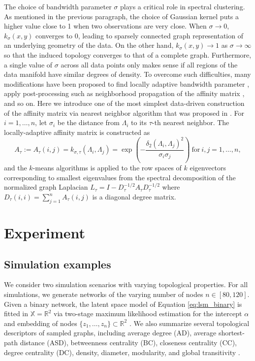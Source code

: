 \documentclass[12pt]{article}
\newcommand{\bbR}{\mathbb{R}}
\newcommand{\bbX}{\mathbb{X}}
\begin{document}
The choice of bandwidth parameter $\sigma$ plays a critical role in spectral clustering. As mentioned in the previous paragraph, the choice of Gaussian kernel puts a higher value close to 1 when two observations are very close. When $\sigma \rightarrow 0$, $k_\sigma (x,y)$ converges to 0, leading to sparsely connected graph representation of an underlying geometry of the data. On the other hand, $k_\sigma(x,y) \rightarrow 1$ as $\sigma \rightarrow \infty$ so that the induced topology converges to that of a complete graph. Furthermore, a single value of $\sigma$ across all data points only makes sense if all regions of the data manifold have similar degrees of density. To overcome such difficulties, many modifications have been proposed to find locally adaptive bandwidth parameter  \citep{zelnik-manor_self-tuning_2004, gu_improved_2009-1, zhang_spectral_2010-1, yang_spectral_2011-1}, apply post-processing such as neighborhood propagation of the affinity matrix \citep{li_constructing_2012-1}, and so on. Here we introduce one of the most simplest data-driven construction of the affinity matrix via nearest neighbor algorithm that was proposed in \cite{zelnik-manor_self-tuning_2004}. For $i=1,\ldots,n$, let $\sigma_i$ be the distance from $\Lambda_i$ to its $\tau$-th nearest neighbor. The locally-adaptive affinity matrix is constructed as
\begin{equation}\label{eq:clustering_zelnik}
A_{\tau}:=A_{\tau} (i,j) = k_{\sigma,\tau} (\Lambda_i, \Lambda_j) = \exp \left( - \frac{\delta_2 (\Lambda_i, \Lambda_j)^2}{\sigma_i \sigma_j}\right)\ \textrm{for} \ i,j=1,\ldots,n,
\end{equation}
and the $k$-means algorithms is applied to the row spaces of $k$ eigenvectors corresponding to smallest eigenvalues from the spectral decomposition of the normalized graph Laplacian $L_{\tau}=I-D_{\tau}^{-1/2}A_{\tau}D_{\tau}^{-1/2}$ where $D_{\tau} (i,i) = \sum_{j=1}^n A_{\tau}(i,j)$ is a diagonal degree matrix. 



\section{Experiment}\label{sec:experiment}
\subsection{Simulation examples}

We consider two simulation scenarios with varying topological properties. For all simulations, we generate networks of the varying number of nodes $n \in [80, 120]$. Given a binary network, the latent space model of Equation \eqref{eq:lsm_binary} is fitted in $\bbX = \bbR^2$ via two-stage maximum likelihood estimation for the intercept $\alpha$ and embedding of nodes $\lbrace z_1, \ldots, z_n \rbrace \subset \bbR^2$ \citep{hoff_latent_2002-1}. We also summarize several topological descriptors of  sampled graphs, including average degree (AD), average shortest-path distance (ASD), betweenness centrality (BC), closeness centrality (CC), degree centrality (DC), density, diameter, modularity, and global transitivity \citep{newman_networks_2010}.
\end{document}
